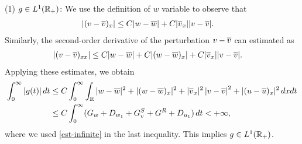 \documentclass[11pt,reqno]{amsart}
\begin{document}
	\noindent (1) $g\in L^1(\mathbb R_+)$: We use the definition of $w$ variable to observe that
	\begin{align*}
	|(v-\overline{v})_x| 
	&\le C|w-\overline{w}|+C|\overline{v}_x||v-\overline{v}|.
	\end{align*}
Similarly, the second-order derivative of the perturbation $v-\overline{v}$ can estimated as
 \begin{align*}
	&|(v-\ov)_{xx}| %
    \le C|w-\ow| +C |(w-\ow)_x| +C |\ov_x||v-\ov|.
    \end{align*}
	Applying these estimates, we obtain
	\begin{align*}
	\int_0^\infty |g(t)|\,dt
	&\le C\int_0^\infty\int_{\mathbb{R}} |w-\overline{w}|^2+ |(w-\overline{w})_x|^2+ |\overline{v}_x|^2\left|v-\overline{v}\right|^2 +|(u-\overline{u})_x|^2\,dxdt\\
	&\le C\int_0^\infty (G_w +D_{w_1}+G^S_v+G^R + D_{u_1})\,d t<+\infty,
	\end{align*}
	where we used \eqref{est-infinite} in the last inequality. This implies $g\in L^1(\mathbb{R}_+)$.\\
	
\end{document}

